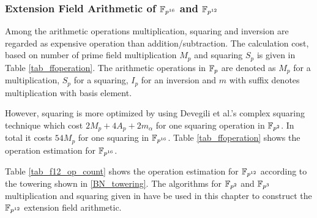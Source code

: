\subsubsection{Extension Field Arithmetic  of \texorpdfstring{$\FPSN$}{} and \texorpdfstring{$\FPTV$}{}}
Among the arithmetic operations multiplication, squaring and inversion are regarded as expensive operation than addition/subtraction. The calculation cost, based on number of prime field multiplication $M_p$ and squaring $S_p$ is given in Table \ref{tab_ffoperation}. The arithmetic operations in ${\mathbb{F}}_{p}$ are denoted as $M_p$ for a multiplication, $S_p$ for a squaring, $I_p$ for an inversion and $m$ with suffix denotes multiplication with basis element.
\begin{table*}[t]
\caption{Number of arithmetic operations in  $\FPSN$ based on \eqref{towering}}
\label{tab_ffoperation}
\centering
{}
\end{table*}
However, squaring is more optimized by using Devegili et al.'s \cite{EPRINT:DOSD06} complex squaring technique which cost $2M_p+4A_p+2m_\alpha$ for one squaring operation in $\mathbb{F}_{p^2}$. In total it costs $54M_p$ for one squaring in $\FPSN$. Table \ref{tab_ffoperation} shows the operation estimation for $\FPSN$.

Table \ref{tab_f12_op_count} shows the operation estimation for $\FPTV$ according to the towering shown in \eqref{BN_towering}. The algorithms for $\mathbb{F}_{p^2}$ and $\mathbb{F}_{p^3}$ multiplication and squaring given in \cite{EPRINT:DEHR15} have be used in this chapter to construct the $\FPTV$ extension field arithmetic. 

\begin{table*}[t]
\caption{Number of arithmetic operations in $\FPTV$ based on \eqref{BN_towering}}
\label{tab_f12_op_count}
\centering
{}
\end{table*}

